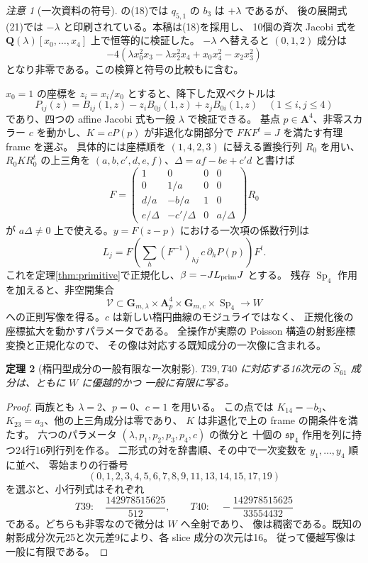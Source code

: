 \documentclass[11pt,a4paper]{ltjsarticle}
\newcommand{\QQ}{\mathbf Q}
\renewcommand{\AA}{\mathbf A}
\newcommand{\GG}{\mathbf G}
\DeclareMathOperator{\Sp}{Sp}
\newtheorem{theorem}{定理}[section]
\theoremstyle{remark}
\newtheorem{remark}[theorem]{注意}
\begin{document}
\begin{remark}[一次資料の符号]
\cite{ortp}の(18)では $q_{5,1}$ の $b_3$ は $+\lambda$ であるが、
後の展開式(21)では $-\lambda$ と印刷されている。本稿は(18)を採用し、
10個の斉次 Jacobi 式を $\QQ(\lambda)[x_0,\ldots,x_4]$ 上で恒等的に検証した。
$-\lambda$ へ替えると $(0,1,2)$ 成分は
\[
 -4(\lambda x_0^2x_3-\lambda x_2^2x_4+x_0x_4^2-x_2x_3^2)
\]
となり非零である。この検算と符号の比較も\cite{elliptic-certificate}に含む。
\end{remark}

$x_0=1$ の座標を $z_i=x_i/x_0$ とすると、降下した双ベクトルは
\[
 P_{ij}(z)=B_{ij}(1,z)-z_iB_{0j}(1,z)+z_jB_{0i}(1,z)
 \quad(1\le i,j\le4)
\]
であり、四つの affine Jacobi 式も一般 $\lambda$ で検証できる。
基点 $p\in\AA^4$、非零スカラー $c$ を動かし、$K=cP(p)$ が非退化な開部分で
$FKF^t=J$ を満たす有理 frame を選ぶ。
具体的には座標順を $(1,4,2,3)$ に替える置換行列 $R_0$ を用い、
$R_0KR_0^t$ の上三角を $(a,b,c',d,e,f)$、$\Delta=af-be+c'd$ と書けば
\[
 F=\begin{pmatrix}
 1&0&0&0\\0&1/a&0&0\\d/a&-b/a&1&0\\
 e/\Delta&-c'/\Delta&0&a/\Delta
 \end{pmatrix}R_0
\]
が $a\Delta\ne0$ 上で使える。$y=F(z-p)$ における一次項の係数行列は
\[
 L_j=F\left(\sum_h(F^{-1})_{hj}\,c\,\partial_hP(p)\right)F^t.
\]
これを定理\ref{thm:primitive}で正規化し、$\beta=-JL_{\rm prim}J$ とする。
残存 $\Sp_4$ 作用を加えると、非空開集合
\[
 \mathcal V\subset\GG_{m,\lambda}\times\AA^4_p\times\GG_{m,c}\times\Sp_4
 \longrightarrow W
\]
への正則写像を得る。$c$ は新しい楕円曲線のモジュライではなく、
正規化後の座標拡大を動かすパラメータである。
全操作が実際の Poisson 構造の射影座標変換と正規化なので、
その像は対応する既知成分の一次像に含まれる。

\begin{theorem}[楕円型成分の一般有限な一次射影]\label{thm:elliptic-dominance}
$T39,T40$ に対応する16次元の $\widetilde S_{61}$ 成分は、ともに $W$ に優越的かつ
一般に有限に写る。
\end{theorem}
\begin{proof}
両族とも $\lambda=2$、$p=0$、$c=1$ を用いる。
この点では $K_{14}=-b_3$、$K_{23}=a_3$、他の上三角成分は零であり、
$K$ は非退化で上の frame の開条件を満たす。
六つのパラメータ $(\lambda,p_1,p_2,p_3,p_4,c)$ の微分と
十個の $\mathfrak{sp}_4$ 作用を列に持つ24行16列行列を作る。
二形式の対を辞書順、その中で一次変数を $y_1,\ldots,y_4$ 順に並べ、
零始まりの行番号
\[
 (0,1,2,3,4,5,6,7,8,9,11,13,14,15,17,19)
\]
を選ぶと、小行列式はそれぞれ
\[
 T39:\quad\frac{142978515625}{512},\qquad
 T40:\quad-\frac{142978515625}{33554432}
\]
である\cite{elliptic-certificate}。どちらも非零なので微分は $W$ へ全射であり、
像は稠密である。既知の射影成分次元25と次元差9により、各 slice 成分の次元は16。
従って優越写像は一般に有限である。
\end{proof}
\end{document}
